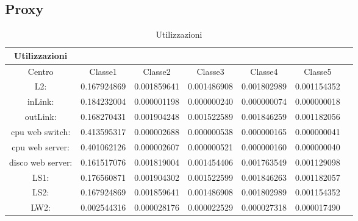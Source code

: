 \subsection{Proxy}
\begin{table}[htbp]
\begin{center}
\begin{tabular}{||c|c|c|c|c|c|c||}
\hline
Utilizzazioni\\
\hline
Centro &Classe1 &Classe2 &Classe3 &Classe4 &Classe5\\
\hline
\hline
L2: &0.167924869 &0.001859641 &0.001486908 &0.001802989 &0.001154352\\
\hline
inLink: &0.184232004 &0.000001198 &0.000000240 &0.000000074 &0.000000018\\
\hline
outLink: &0.168270431 &0.001904248 &0.001522589 &0.001846259 &0.001182056\\
\hline
cpu web switch: &0.413595317 &0.000002688 &0.000000538 &0.000000165 &0.000000041\\
\hline
cpu web server: &0.401062126 &0.000002607 &0.000000521 &0.000000160 &0.000000040\\
\hline
disco web server: &0.161517076 &0.001819004 &0.001454406 &0.001763549 &0.001129098\\
\hline
LS1: &0.176560871 &0.001904302 &0.001522599 &0.001846263 &0.001182057\\
\hline
LS2: &0.167924869 &0.001859641 &0.001486908 &0.001802989 &0.001154352\\
\hline
LW2: &0.002544316 &0.000028176 &0.000022529 &0.000027318 &0.000017490\\
\hline
\end{tabular}
\end{center}
\caption{Utilizzazioni}
\label{utilizzazioni}
\end{table}

